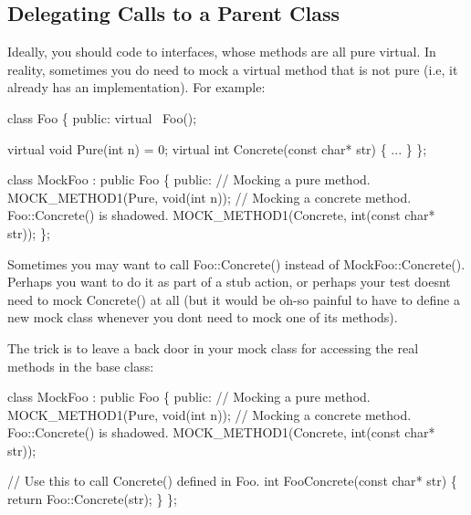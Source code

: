 \subsection*{Delegating Calls to a Parent Class}

Ideally, you should code to interfaces, whose methods are all pure virtual. In reality, sometimes you do need to mock a virtual method that is not pure (i.\+e, it already has an implementation). For example\+:


\begin{DoxyCode}
\textcolor{keyword}{class }Foo \{
 \textcolor{keyword}{public}:
  \textcolor{keyword}{virtual} ~Foo();

  \textcolor{keyword}{virtual} \textcolor{keywordtype}{void} Pure(\textcolor{keywordtype}{int} n) = 0;
  \textcolor{keyword}{virtual} \textcolor{keywordtype}{int} Concrete(\textcolor{keyword}{const} \textcolor{keywordtype}{char}* str) \{ ... \}
\};

\textcolor{keyword}{class }MockFoo : \textcolor{keyword}{public} Foo \{
 \textcolor{keyword}{public}:
  \textcolor{comment}{// Mocking a pure method.}
  MOCK\_METHOD1(Pure, \textcolor{keywordtype}{void}(\textcolor{keywordtype}{int} n));
  \textcolor{comment}{// Mocking a concrete method.  Foo::Concrete() is shadowed.}
  MOCK\_METHOD1(Concrete, \textcolor{keywordtype}{int}(\textcolor{keyword}{const} \textcolor{keywordtype}{char}* str));
\};
\end{DoxyCode}


Sometimes you may want to call {\ttfamily Foo\+::\+Concrete()} instead of {\ttfamily Mock\+Foo\+::\+Concrete()}. Perhaps you want to do it as part of a stub action, or perhaps your test doesn\textquotesingle{}t need to mock {\ttfamily Concrete()} at all (but it would be oh-\/so painful to have to define a new mock class whenever you don\textquotesingle{}t need to mock one of its methods).

The trick is to leave a back door in your mock class for accessing the real methods in the base class\+:


\begin{DoxyCode}
\textcolor{keyword}{class }MockFoo : \textcolor{keyword}{public} Foo \{
 \textcolor{keyword}{public}:
  \textcolor{comment}{// Mocking a pure method.}
  MOCK\_METHOD1(Pure, \textcolor{keywordtype}{void}(\textcolor{keywordtype}{int} n));
  \textcolor{comment}{// Mocking a concrete method.  Foo::Concrete() is shadowed.}
  MOCK\_METHOD1(Concrete, \textcolor{keywordtype}{int}(\textcolor{keyword}{const} \textcolor{keywordtype}{char}* str));

  \textcolor{comment}{// Use this to call Concrete() defined in Foo.}
  \textcolor{keywordtype}{int} FooConcrete(\textcolor{keyword}{const} \textcolor{keywordtype}{char}* str) \{ \textcolor{keywordflow}{return} Foo::Concrete(str); \}
\};
\end{DoxyCode}


